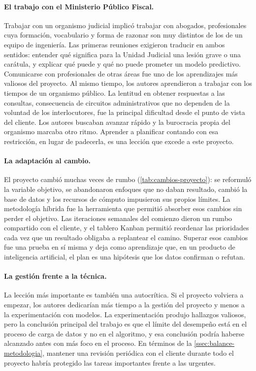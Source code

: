 \paragraph{El trabajo con el Ministerio Público Fiscal.} Trabajar con un organismo judicial implicó trabajar con abogados, profesionales cuya formación, vocabulario y forma de razonar son muy distintos de los de un equipo de ingeniería. Las primeras reuniones exigieron traducir en ambos sentidos: entender qué significa para la Unidad Judicial una lesión grave o una carátula, y explicar qué puede y qué no puede prometer un modelo predictivo. Comunicarse con profesionales de otras áreas fue uno de los aprendizajes más valiosos del proyecto. Al mismo tiempo, los autores aprendieron a trabajar con los tiempos de un organismo público. La lentitud en obtener respuestas a las consultas, consecuencia de circuitos administrativos que no dependen de la voluntad de los interlocutores, fue la principal dificultad desde el punto de vista del cliente. Los autores buscaban avanzar rápido y la burocracia propia del organismo marcaba otro ritmo. Aprender a planificar contando con esa restricción, en lugar de padecerla, es una lección que excede a este proyecto.

\paragraph{La adaptación al cambio.} El proyecto cambió muchas veces de rumbo (\cref{tab:cambios-proyecto}): se reformuló la variable objetivo, se abandonaron enfoques que no daban resultado, cambió la base de datos y los recursos de cómputo impusieron sus propios límites. La metodología híbrida fue la herramienta que permitió absorber esos cambios sin perder el objetivo. Las iteraciones semanales del comienzo dieron un rumbo compartido con el cliente, y el tablero Kanban permitió reordenar las prioridades cada vez que un resultado obligaba a replantear el camino. Superar esos cambios fue una prueba en sí misma y deja como aprendizaje que, en un producto de inteligencia artificial, el plan es una hipótesis que los datos confirman o refutan.

\paragraph{La gestión frente a la técnica.} La lección más importante es también una autocrítica. Si el proyecto volviera a empezar, los autores dedicarían más tiempo a la gestión del proyecto y menos a la experimentación con modelos. La experimentación produjo hallazgos valiosos, pero la conclusión principal del trabajo es que el límite del desempeño está en el proceso de carga de datos y no en el algoritmo, y esa conclusión podría haberse alcanzado antes con más foco en el proceso. En términos de la \cref{ssec:balance-metodologia}, mantener una revisión periódica con el cliente durante todo el proyecto habría protegido las tareas importantes frente a las urgentes.

